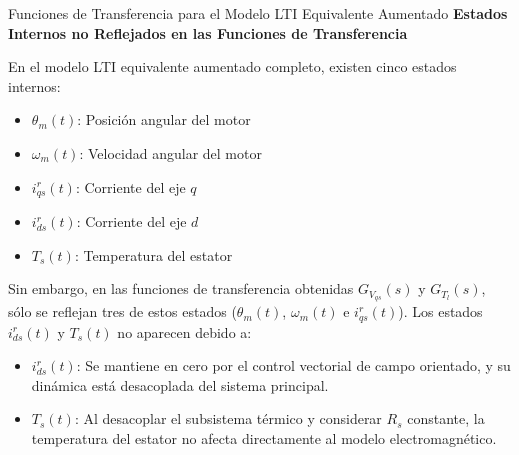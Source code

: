 \documentclass[12pt]{beamer}
\begin{document}
\begin{frame}{\small Funciones de Transferencia para el Modelo LTI Equivalente Aumentado} \footnotesize
\textbf{Estados Internos no Reflejados en las Funciones de Transferencia}

En el modelo LTI equivalente aumentado completo, existen cinco estados internos:

\begin{itemize}
    \item \( \theta_m(t) \): Posición angular del motor
    \item \( \omega_m(t) \): Velocidad angular del motor
    \item \( i_{qs}^r(t) \): Corriente del eje \( q \)
    \item \( i_{ds}^r(t) \): Corriente del eje \( d \)
    \item \( T_s(t) \): Temperatura del estator
\end{itemize}

Sin embargo, en las funciones de transferencia obtenidas \( G_{V_{qs}}(s) \) y \( G_{T_l}(s) \), sólo se reflejan tres de estos estados (\( \theta_m(t) \), \( \omega_m(t) \) e \( i_{qs}^r(t) \)). Los estados \( i_{ds}^r(t) \) y \( T_s(t) \) no aparecen debido a:

\begin{itemize}
    \item \( i_{ds}^r(t) \): Se mantiene en cero por el control vectorial de campo orientado, y su dinámica está desacoplada del sistema principal.
    \item \( T_s(t) \): Al desacoplar el subsistema térmico y considerar \( R_s \) constante, la temperatura del estator no afecta directamente al modelo electromagnético.
\end{itemize}
\end{frame}
\end{document}
